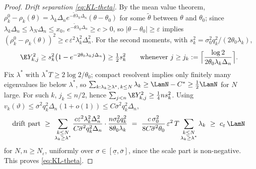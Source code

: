 \begin{proof}
\emph{Drift separation \eqref{eq:KL-theta}.}
By the mean value theorem,
$\rho_k^0-\rho_k(\theta)
=\lambda_k\Delta_ne^{-\tilde\theta\lambda_k\Delta_n}(\theta-\theta_0)$ for
some $\tilde\theta$ between $\theta$ and $\theta_0$; since
$\lambda_k\Delta_n\le\lambda_N\Delta_n\le x_0$,
$e^{-\tilde\theta\lambda_k\Delta_n}\ge c>0$, so
$|\theta-\theta_0|\ge\varepsilon$ implies
$(\rho_k^0-\rho_k(\theta))^2\ge c\,\varepsilon^2\lambda_k^2\Delta_n^2$.
For the second moments, with $s_k^2=\sigma_0^2q_k^2/(2\theta_0\lambda_k)$,
\[
 \E Y_{k,j}^2\ge s_k^2\big(1-e^{-2\theta_0\lambda_kj\Delta_n}\big)
 \ge\tfrac12 s_k^2
 \qquad\text{whenever } j\ge j_k:=\Big\lceil\frac{\log2}{2\theta_0
 \lambda_k\Delta_n}\Big\rceil .
\]
Fix $\lambda^\ast$ with $\lambda^\ast T\ge2\log2/\theta_0$; compact
resolvent implies only finitely many eigenvalues lie below $\lambda^\ast$,
so $\sum_{k:\lambda_k\ge\lambda^\ast,\,k\le N}\lambda_k\ge\LamN-C^\ast
\ge\tfrac12\LamN$ for $N$ large. For such $k$, $j_k\le n/2$, hence
$\sum_{j<n}\E Y_{k,j}^2\ge\tfrac14 ns_k^2$. Using
$v_k(\vartheta)\le\overline\sigma^2q_k^2\Delta_n(1+o(1))
\le C\overline\sigma^2q_k^2\Delta_n$,
\[
 \text{drift part}
 \ \ge\ \sum_{\substack{k\le N\\ \lambda_k\ge\lambda^\ast}}
 \frac{c\varepsilon^2\lambda_k^2\Delta_n^2}
 {C\overline\sigma^2q_k^2\Delta_n}\cdot
 \frac{n\sigma_0^2q_k^2}{8\theta_0\lambda_k}
 \ =\ \frac{c\,\sigma_0^2}{8C\overline\sigma^2\theta_0}\,
 \varepsilon^2\,T
 \sum_{\substack{k\le N\\ \lambda_k\ge\lambda^\ast}}\lambda_k
 \ \ge\ c_\varepsilon\,\LamN
\]
for $N,n\ge N_\varepsilon$, uniformly over
$\sigma\in[\underline\sigma,\overline\sigma]$, since the scale part is
non-negative. This proves \eqref{eq:KL-theta}.
\end{proof}
